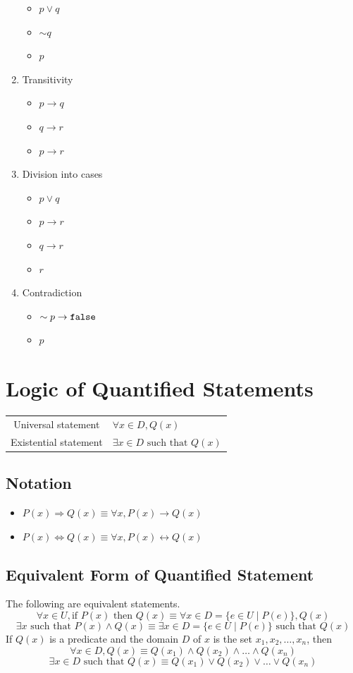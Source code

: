 \documentclass[12pt]{article}
\begin{document}
\begin{enumerate}
\begin{itemize}
\item[] $p\lor q$
\item[] $\sim q$
\item $p$
\end{itemize}
\item Transitivity
\begin{itemize}
\item[] $p\to q$
\item[] $q\to r$
\item $p\to r$
\end{itemize}
\item Division into cases
\begin{itemize}
\item[] $p\lor q$
\item[] $p \to r$
\item[] $q\to r$
\item $r$
\end{itemize}
\item Contradiction
\begin{itemize}
\item[] $\sim p \to \text{\texttt{false}}$
\item $p$
\end{itemize}
\end{enumerate}
\clearpage
\section{Logic of Quantified Statements}
\begin{table}[h]
\centering
\begin{tabular}{cl}
Universal statement&$\forall x\in D, Q(x)$\\
Existential statement & $\exists x\in D \text{ such that }Q(x)$\\
\end{tabular}
\end{table}
\subsection{Notation}
\begin{itemize}
\item $P(x)\Rightarrow Q(x)\equiv \forall x, P(x)\rightarrow Q(x)$
\item $P(x)\Leftrightarrow Q(x)\equiv \forall x, P(x)\leftrightarrow Q(x)$
\end{itemize}
\subsection{Equivalent Form of Quantified Statement}
The following are equivalent statements.
\[
\forall x\in U,\text{if }P(x)\text{ then }Q(x) \equiv \forall x\in D=\{e\in U\mid P(e)\}, Q(x)
\]
\[
\exists x\text{ such that }P(x)\land Q(x) \equiv \exists x\in D=\{e\in U \mid P(e)\}\text{ such that }Q(x)
\]
If $Q(x)$ is a predicate and the domain $D$ of $x$ is the set ${x_1, x_2, \ldots ,x_n}$, then
\[
\forall x\in D, Q(x)\equiv Q(x_1)\land Q(x_2)\land\ldots\land Q(x_n)
\]
\[
\exists x\in D\text{ such that }Q(x)\equiv Q(x_1)\lor Q(x_2)\lor \ldots\lor Q(x_n)
\]
\end{document}

